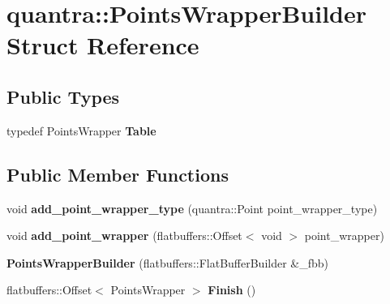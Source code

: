 \hypertarget{structquantra_1_1PointsWrapperBuilder}{}\section{quantra\+:\+:Points\+Wrapper\+Builder Struct Reference}
\label{structquantra_1_1PointsWrapperBuilder}
\subsection*{Public Types}
\begin{DoxyCompactItemize}
\item 
\mbox{\label{structquantra_1_1PointsWrapperBuilder_a55405fe74f072248300e164083db2bc6}} 
typedef Points\+Wrapper {\bfseries Table}
\end{DoxyCompactItemize}
\subsection*{Public Member Functions}
\begin{DoxyCompactItemize}
\item 
\mbox{\label{structquantra_1_1PointsWrapperBuilder_a375a00dc8bd5dcf9cd033b0ae2f788e8}} 
void {\bfseries add\+\_\+point\+\_\+wrapper\+\_\+type} (quantra\+::\+Point point\+\_\+wrapper\+\_\+type)
\item 
\mbox{\label{structquantra_1_1PointsWrapperBuilder_a23be7a3bc3b03536e3f1eca429925e48}} 
void {\bfseries add\+\_\+point\+\_\+wrapper} (flatbuffers\+::\+Offset$<$ void $>$ point\+\_\+wrapper)
\item 
\mbox{\label{structquantra_1_1PointsWrapperBuilder_aba0d03c394d4d629e51b3310ed49fd4e}} 
{\bfseries Points\+Wrapper\+Builder} (flatbuffers\+::\+Flat\+Buffer\+Builder \&\+\_\+fbb)
\item 
\mbox{\label{structquantra_1_1PointsWrapperBuilder_ab2f3114dbd34161e442ad342d9d68137}} 
flatbuffers\+::\+Offset$<$ Points\+Wrapper $>$ {\bfseries Finish} ()
\end{DoxyCompactItemize}
